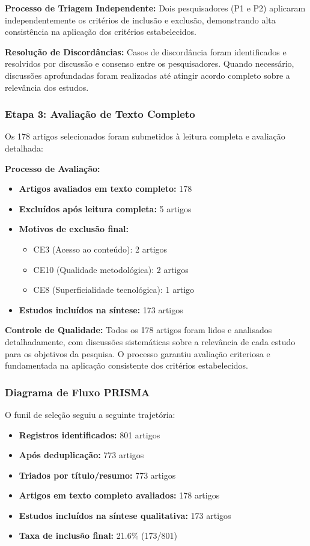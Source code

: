 \documentclass[english, spanish, brazilian]{RBIEarticle} %
\begin{document}
\textbf{Processo de Triagem Independente:} Dois pesquisadores (P1 e P2) aplicaram independentemente os critérios de inclusão e exclusão, demonstrando alta consistência na aplicação dos critérios estabelecidos.

\textbf{Resolução de Discordâncias:} Casos de discordância foram identificados e resolvidos por discussão e consenso entre os pesquisadores. Quando necessário, discussões aprofundadas foram realizadas até atingir acordo completo sobre a relevância dos estudos.

\subsubsection{Etapa 3: Avaliação de Texto Completo}

Os 178 artigos selecionados foram submetidos à leitura completa e avaliação detalhada:

\textbf{Processo de Avaliação:}
\begin{itemize}
\item \textbf{Artigos avaliados em texto completo:} 178
\item \textbf{Excluídos após leitura completa:} 5 artigos
\item \textbf{Motivos de exclusão final:}
  \begin{itemize}
  \item CE3 (Acesso ao conteúdo): 2 artigos
  \item CE10 (Qualidade metodológica): 2 artigos
  \item CE8 (Superficialidade tecnológica): 1 artigo
  \end{itemize}
\item \textbf{Estudos incluídos na síntese:} 173 artigos
\end{itemize}

\textbf{Controle de Qualidade:} Todos os 178 artigos foram lidos e analisados detalhadamente, com discussões sistemáticas sobre a relevância de cada estudo para os objetivos da pesquisa. O processo garantiu avaliação criteriosa e fundamentada na aplicação consistente dos critérios estabelecidos.

\subsubsection{Diagrama de Fluxo PRISMA}

O funil de seleção seguiu a seguinte trajetória:
\begin{itemize}
\item \textbf{Registros identificados:} 801 artigos
\item \textbf{Após deduplicação:} 773 artigos  
\item \textbf{Triados por título/resumo:} 773 artigos
\item \textbf{Artigos em texto completo avaliados:} 178 artigos
\item \textbf{Estudos incluídos na síntese qualitativa:} 173 artigos
\item \textbf{Taxa de inclusão final:} 21.6\% (173/801)
\end{itemize}
\end{document}
